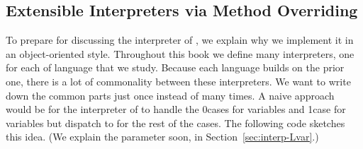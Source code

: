 \documentclass[7x10]{TimesAPriori_MIT}%
\def\racketEd{0}
\def\pythonEd{1}
\def\edition{1}
\newcommand{\racket}[1]{{\if\edition\racketEd{#1}\fi}}
\newcommand{\python}[1]{{\if\edition\pythonEd #1\fi}}
\begin{document}
\subsection{Extensible Interpreters via Method Overriding}
\label{sec:extensible-interp}

To prepare for discussing the interpreter of \LangVar{}, we explain
why we implement it in an object-oriented style. Throughout this book
we define many interpreters, one for each of language that we
study. Because each language builds on the prior one, there is a lot
of commonality between these interpreters. We want to write down the
common parts just once instead of many times. A naive approach would
be for the interpreter of \LangVar{} to handle the
\racket{cases for variables and }
\python{case for variables}
but dispatch to \LangInt{}
for the rest of the cases. The following code sketches this idea. (We
explain the  parameter soon, in
Section~\ref{sec:interp-Lvar}.)
\end{document}
